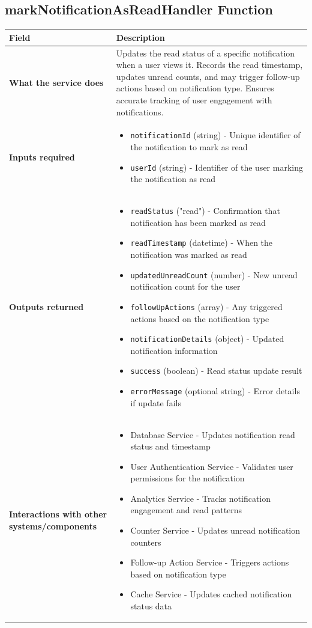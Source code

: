 \documentclass[11pt,a4paper]{article}
\begin{document}
\subsection{markNotificationAsReadHandler Function}

\begin{longtable}{|p{3cm}|p{12cm}|}
\hline
\textbf{Field} & \textbf{Description} \\
\hline
\textbf{What the service does} & 
Updates the read status of a specific notification when a user views it. Records the read timestamp, updates unread counts, and may trigger follow-up actions based on notification type. Ensures accurate tracking of user engagement with notifications. \\
\hline
\textbf{Inputs required} & 
\begin{itemize}[nosep]
\item \texttt{notificationId} (string) - Unique identifier of the notification to mark as read
\item \texttt{userId} (string) - Identifier of the user marking the notification as read
\end{itemize} \\
\hline
\textbf{Outputs returned} & 
\begin{itemize}[nosep]
\item \texttt{readStatus} ("read") - Confirmation that notification has been marked as read
\item \texttt{readTimestamp} (datetime) - When the notification was marked as read
\item \texttt{updatedUnreadCount} (number) - New unread notification count for the user
\item \texttt{followUpActions} (array) - Any triggered actions based on the notification type
\item \texttt{notificationDetails} (object) - Updated notification information
\item \texttt{success} (boolean) - Read status update result
\item \texttt{errorMessage} (optional string) - Error details if update fails
\end{itemize} \\
\hline
\textbf{Interactions with other systems/components} & 
\begin{itemize}[nosep]
\item Database Service - Updates notification read status and timestamp
\item User Authentication Service - Validates user permissions for the notification
\item Analytics Service - Tracks notification engagement and read patterns
\item Counter Service - Updates unread notification counters
\item Follow-up Action Service - Triggers actions based on notification type
\item Cache Service - Updates cached notification status data
\end{itemize} \\
\hline
\end{longtable}
\end{document}
